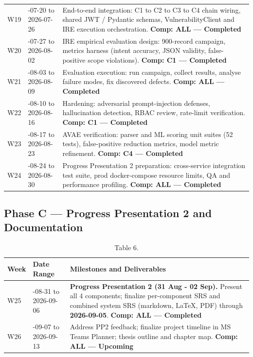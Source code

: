 \documentclass[10pt,journal,onecolumn]{IEEEtran}
\begin{document}
\begin{table}[h]
\begin{tabularx}{\columnwidth}{l >{\raggedright\arraybackslash}X >{\raggedright\arraybackslash}X}
W19 & 2026-07-20 to 2026-07-26 & End-to-end integration: C1 to C2 to C3 to C4 chain wiring, shared JWT / Pydantic schemas, VulnerabilityClient and IRE execution orchestration. \textbf{Comp: ALL --- Completed}\\
W20 & 2026-07-27 to 2026-08-02 & IRE empirical evaluation design: 900-record campaign, metrics harness (intent accuracy, JSON validity, false-positive scope violations). \textbf{Comp: C1 --- Completed}\\
W21 & 2026-08-03 to 2026-08-09 & Evaluation execution: run campaign, collect results, analyse failure modes, fix discovered defects. \textbf{Comp: ALL --- Completed}\\
W22 & 2026-08-10 to 2026-08-16 & Hardening: adversarial prompt-injection defenses, hallucination detection, RBAC review, rate-limit verification. \textbf{Comp: C1 --- Completed}\\
W23 & 2026-08-17 to 2026-08-23 & AVAE verification: parser and ML scoring unit suites (52 tests), false-positive reduction metrics, model metric refinement. \textbf{Comp: C4 --- Completed}\\
W24 & 2026-08-24 to 2026-08-30 & Progress Presentation 2 preparation: cross-service integration test suite, prod docker-compose resource limits, QA and performance profiling. \textbf{Comp: ALL --- Completed}\\
\bottomrule
\end{tabularx}
\end{table}

\subsection{Phase C --- Progress Presentation 2 and Documentation}

\begin{table}[h]
\caption{Table 6.}
\label{tab:t6}
\begin{tabularx}{\columnwidth}{l >{\raggedright\arraybackslash}X >{\raggedright\arraybackslash}X}
\toprule
\textbf{Week} & \textbf{Date Range} & \textbf{Milestones and Deliverables}\\
\midrule
W25 & 2026-08-31 to 2026-09-06 & \textbf{Progress Presentation 2 (31 Aug - 02 Sep).} Present all 4 components; finalize per-component SRS and combined system SRS (markdown, LaTeX, PDF) through \textbf{2026-09-05}. \textbf{Comp: ALL --- Completed}\\
W26 & 2026-09-07 to 2026-09-13 & Address PP2 feedback; finalize project timeline in MS Teams Planner; thesis outline and chapter map. \textbf{Comp: ALL --- Upcoming}\\
\bottomrule
\end{tabularx}
\end{table}
\end{document}
